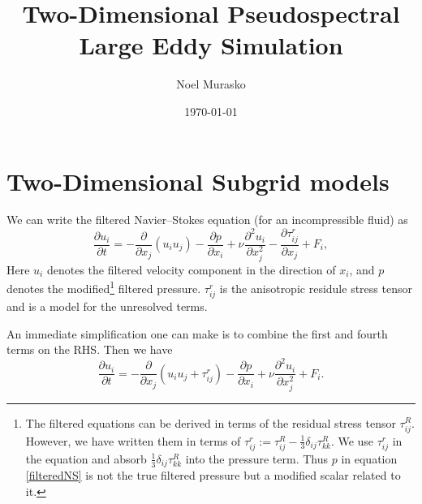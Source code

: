 \documentclass[11pt,a4paper]{article}
\author{Noel Murasko}
\title{Two-Dimensional Pseudospectral Large Eddy Simulation}
\date{\today}
\begin{document}
\maketitle
\noindent 
\section{Two-Dimensional Subgrid models}
We can write the filtered Navier--Stokes equation (for an incompressible fluid) as
$$\frac{\partial {u}_i}{\partial t} =- \frac{\partial }{\partial x_j}({u}_i{u}_j)-\frac{\partial {p}}{\partial x_i}+ \nu \frac{\partial^2u_i}{\partial x_j^2} -\frac{\partial \tau_{ij}^r}{\partial x_j} + {F}_i,$$
Here $u_i$ denotes the filtered velocity component in the direction of $x_i$, and $p$ denotes the modified\footnote{The filtered equations can be derived in terms of the residual stress tensor $\tau_{ij}^R$. However, we have written them in terms of $\tau_{ij}^r := \tau^R_{ij} - \frac{1}{3}\delta_{ij}\tau^R_{kk}$. We use $\tau_{ij}^r$ in the equation and absorb $\frac{1}{3}\delta_{ij}\tau^R_{kk}$ into the pressure term. Thus $p$ in equation \ref{filteredNS} is not the true filtered pressure but a modified scalar related to it.} filtered pressure. $\tau^r_{ij}$ is the anisotropic residule stress tensor and is a model for the unresolved terms. 

An immediate simplification one can make is to combine the first and fourth terms on the RHS. Then we have
\begin{equation}\label{filteredNS}
\frac{\partial {u}_i}{\partial t} =- \frac{\partial }{\partial x_j}\left({u}_i{u}_j +\tau_{ij}^r\right)-\frac{\partial {p}}{\partial x_i}+ \nu \frac{\partial^2u_i}{\partial x_j^2} + {F}_i.
\end{equation}
\end{document}
